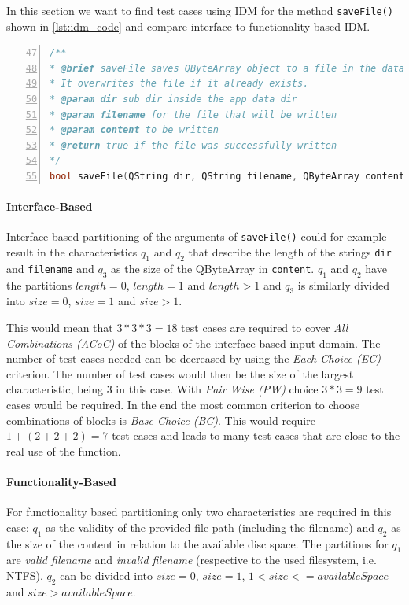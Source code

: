\documentclass{scrreprt}
\begin{document}
In this section we want to find test cases using IDM for the method \texttt{saveFile()} shown in \vref{lst:idm_code} and compare interface to functionality-based IDM.

\bigskip
\begin{lstlisting}[language=C++,
							numbers=left,
							firstnumber=47,
							directivestyle={\color{black}}
							emph={int,char,double,float,unsigned},
							emphstyle={\color{blue}},
							caption=src/FileSystemManager.h,
							label=lst:idm_code]
/**
* @brief saveFile saves QByteArray object to a file in the data dir
* It overwrites the file if it already exists.
* @param dir sub dir inside the app data dir
* @param filename for the file that will be written
* @param content to be written
* @return true if the file was successfully written
*/
bool saveFile(QString dir, QString filename, QByteArray content) const;
\end{lstlisting}
\bigskip

\paragraph{Interface-Based}

Interface based partitioning of the arguments of \texttt{saveFile()} could for example result in the characteristics $q_1$ and $q_2$ that describe the length of the strings \texttt{dir} and \texttt{filename} and $q_3$ as the size of the QByteArray in \texttt{content}. $q_1$ and $q_2$ have the partitions $length=0$, $length=1$ and $length>1$ and $q_3$ is similarly divided into $size=0$, $size=1$ and $size>1$.

This would mean that $3*3*3=18$ test cases are required to cover \textit{All Combinations (ACoC)} of the blocks of the interface based input domain.
The number of test cases needed can be decreased by using the \textit{Each Choice (EC)} criterion. The number of test cases would then be the size of the largest characteristic, being 3 in this case. With \textit{Pair Wise (PW)} choice $3*3=9$ test cases would be required.
In the end the most common criterion to choose combinations of blocks is \textit{Base Choice (BC)}. This would require $1+(2+2+2)=7$ test cases and leads to many test cases that are close to the real use of the function.

\paragraph{Functionality-Based}

For functionality based partitioning only two characteristics are required in this case: $q_1$ as the validity of the provided file path (including the filename) and $q_2$ as the size of the content in relation to the available disc space. The partitions for $q_1$ are \textit{valid filename} and \textit{invalid filename} (respective to the used filesystem, i.e. NTFS). $q_2$ can be divided into $size=0$, $size=1$, $1<size<=availableSpace$ and $size>availableSpace$.
\end{document}
